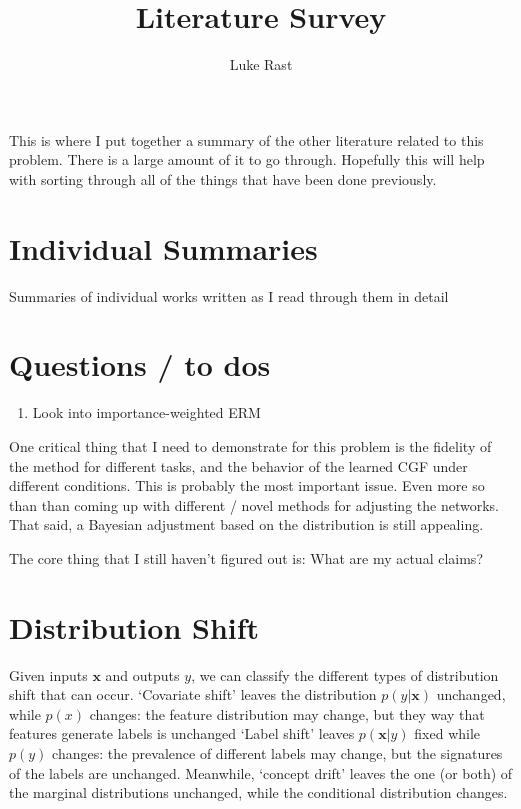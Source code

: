 \documentclass{article}[10pt]      %
\begin{document}
\title{Literature Survey}
\author{Luke Rast}
\maketitle


This is where I put together a summary of the other literature related to this problem.
There is a large amount of it to go through.
Hopefully this will help with sorting through all of the things that have been done previously.


\section{Individual Summaries}
Summaries of individual works written as I read through them in detail







\section{Questions / to dos}

\begin{enumerate}
  \item Look into importance-weighted ERM
\end{enumerate}

One critical thing that I need to demonstrate for this problem is the fidelity of the method for different tasks, and the behavior of the learned CGF under different conditions. 
This is probably the most important issue. Even more so than than coming up with different / novel methods for adjusting the networks. That said, a Bayesian adjustment based on the distribution is still appealing.


The core thing that I still haven't figured out is: What are my actual claims?



\section{Distribution Shift}

Given inputs $\bm{x}$ and outputs $y$, we can classify the different types of distribution shift that can occur.
`Covariate shift' leaves the distribution $p(y|\bm{x})$ unchanged, while $p(x)$ changes: the feature distribution may change, but they way that features generate labels is unchanged
`Label shift' leaves $p(\bm{x}|y)$ fixed while $p(y)$ changes: the prevalence of different labels may change, but the signatures of the labels are unchanged.
Meanwhile, `concept drift' leaves the one (or both) of the marginal distributions unchanged, while the conditional distribution changes.
\end{document}
